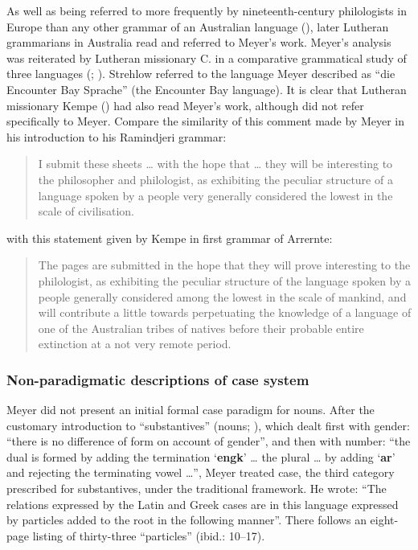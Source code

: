 As well as being referred to more frequently by nineteenth-century philologists in Europe than any other grammar of an Australian language (), later Lutheran grammarians in Australia read and referred to Meyer’s work. Meyer’s analysis was reiterated by Lutheran missionary C. \citet{strehlow_untitled_1931} in a comparative grammatical study of three languages (; ). Strehlow referred to the language Meyer described as “die Encounter Bay Sprache” (the Encounter Bay language). It is clear that Lutheran missionary Kempe () had also read Meyer’s work, although \citet{Kempe1891} did not refer specifically to Meyer. Compare the similarity of this comment made by Meyer in his introduction to his Ramindjeri grammar:

\begin{quote} 
I submit these sheets … with the hope that … they will be interesting to the philosopher and philologist, as exhibiting the peculiar structure of a language spoken by a people very generally considered the lowest in the scale of civilisation. \citep[vii]{meyer_vocabulary_1843}
\end{quote}

with this statement given by Kempe in first grammar of Arrernte:

\begin{quote}
The pages are submitted in the hope that they will prove interesting to the philologist, as exhibiting the peculiar structure of the language spoken by a people generally considered among the lowest in the scale of mankind, and will contribute a little towards perpetuating the knowledge of a language of one of the Australian tribes of natives before their probable entire extinction at a not very remote period. \citep[1]{Kempe1891}
\end{quote}

\subsubsection{Non-paradigmatic descriptions of case system}
\label{sec:key:6.1.2.1}\label{bkm:Ref456091394}

Meyer did not present an initial formal case paradigm for nouns. After the customary introduction to “substantives” (nouns; \citeyear[10--11]{meyer_vocabulary_1843}), which dealt first with gender: “there is no difference of form on account of gender”, and then with number: “the dual is formed by adding the termination `\textbf{engk}' … the plural … by adding `\textbf{ar}' and rejecting the terminating vowel …”, Meyer treated case, the third category prescribed for substantives, under the traditional framework. He wrote: “The relations expressed by the Latin and Greek cases are in this language expressed by particles added to the root in the following manner”. There follows an eight-page listing of thirty-three “particles” (ibid.: 10--17).

